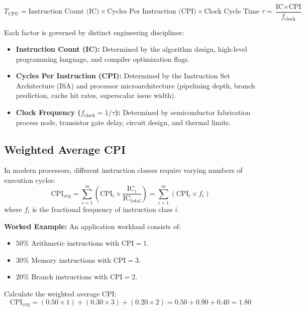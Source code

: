\begin{equation}
\label{eq:cpu_time_formula}
\boxed{T_{\text{CPU}} = \text{Instruction Count (IC)} \times \text{Cycles Per Instruction (CPI)} \times \text{Clock Cycle Time } \tau = \frac{\text{IC} \times \text{CPI}}{f_{\text{clock}}}}
\end{equation}

Each factor is governed by distinct engineering disciplines:
\begin{itemize}
    \item \textbf{Instruction Count (IC):} Determined by the algorithm design, high-level programming language, and compiler optimization flags.
    \item \textbf{Cycles Per Instruction (CPI):} Determined by the Instruction Set Architecture (ISA) and processor microarchitecture (pipelining depth, branch prediction, cache hit rates, superscalar issue width).
    \item \textbf{Clock Frequency ($f_{\text{clock}} = 1/\tau$):} Determined by semiconductor fabrication process node, transistor gate delay, circuit design, and thermal limits.
\end{itemize}

\subsection{Weighted Average CPI}
In modern processors, different instruction classes require varying numbers of execution cycles:
\begin{equation}
\label{eq:weighted_cpi}
\text{CPI}_{\text{avg}} = \sum_{i=1}^{m} \left( \text{CPI}_i \times \frac{\text{IC}_i}{\text{IC}_{\text{total}}} \right) = \sum_{i=1}^{m} (\text{CPI}_i \times f_i)
\end{equation}
where $f_i$ is the fractional frequency of instruction class $i$.

\textbf{Worked Example:} An application workload consists of:
\begin{itemize}
    \item $50\%$ Arithmetic instructions with $\text{CPI} = 1$.
    \item $30\%$ Memory instructions with $\text{CPI} = 3$.
    \item $20\%$ Branch instructions with $\text{CPI} = 2$.
\end{itemize}
Calculate the weighted average CPI:
\[ \text{CPI}_{\text{avg}} = (0.50 \times 1) + (0.30 \times 3) + (0.20 \times 2) = 0.50 + 0.90 + 0.40 = \mathbf{1.80} \]

